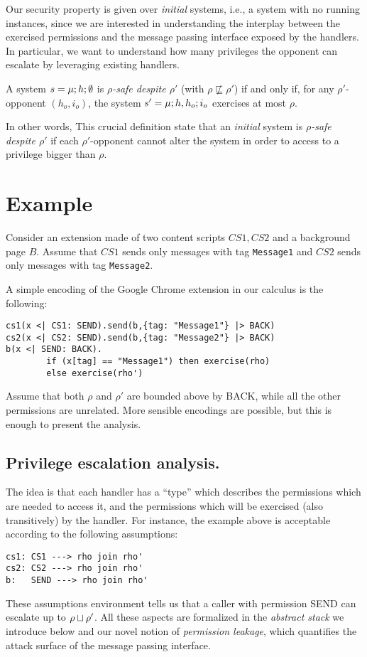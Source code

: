 Our security property is given over \emph{initial} systems, i.e., a system with no running instances, since we are interested in understanding the interplay between the exercised permissions and the message passing interface exposed by the handlers. In particular, we want to understand how many privileges the opponent can escalate by leveraging existing handlers.

\begin{definition}
\label{def:safety}
A system $s = \mu;h;\emptyset$ is \emph{$\rho$-safe despite $\rho'$} (with $\rho \not\sqsubseteq \rho'$) if and only if, for any $\rho'$-opponent $(h_o,i_o)$, the system $s' = \mu;h,h_o;i_o$ exercises at most $\rho$.
\end{definition}
In other words, This crucial definition state that an \emph{initial} system is \emph{$\rho$-safe despite $\rho'$} if each $\rho'$-opponent cannot alter the system in order to access to a privilege bigger than $\rho$.

\section{Example}
\label{sec:Example}
Consider an extension made of two content scripts $CS1,CS2$ and a background page $B$. Assume that $CS1$ sends only messages with tag \texttt{Message1} and $CS2$ sends only messages with tag \texttt{Message2}.

A simple encoding of the Google Chrome extension in our calculus is the following:
\begin{verbatim}
cs1(x <| CS1: SEND).send(b,{tag: "Message1"} |> BACK)
cs2(x <| CS2: SEND).send(b,{tag: "Message2"} |> BACK)
b(x <| SEND: BACK).
        if (x[tag] == "Message1") then exercise(rho) 
        else exercise(rho')
\end{verbatim}
Assume that both $\rho$ and $\rho'$ are bounded above by BACK, while all the other permissions are unrelated. More sensible encodings are possible, but this is enough to present the analysis.

\subsection{Privilege escalation analysis.}
The idea is that each handler has a ``type'' which describes the permissions which are needed to access it, and the permissions which will be exercised (also transitively) by the handler. For instance, the example above is acceptable according to the following assumptions:
\begin{verbatim}
cs1: CS1 ---> rho join rho'
cs2: CS2 ---> rho join rho'
b:   SEND ---> rho join rho'
\end{verbatim}
These assumptions environment tells us that a caller with permission SEND can escalate up to $\rho \sqcup \rho'$. All these aspects are formalized in the \emph{abstract stack} we introduce below and our novel notion of \emph{permission leakage}, which quantifies the attack surface of the message passing interface.

